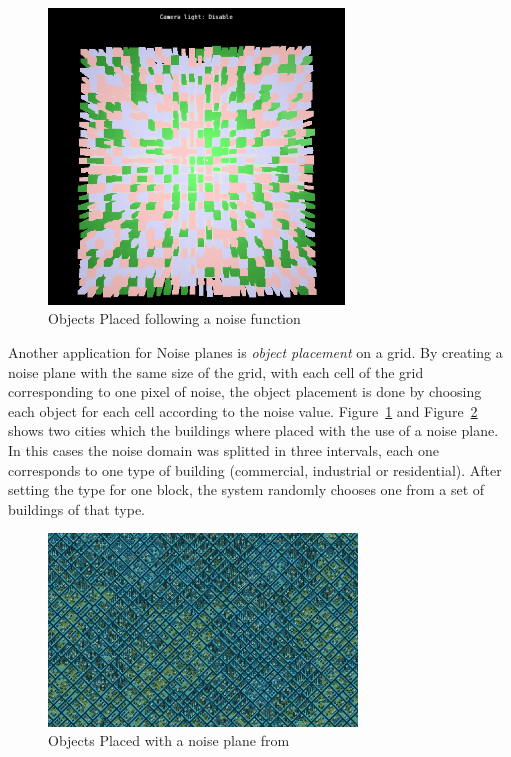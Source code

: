 \begin{figure}[htbp]
    \centering
    \includegraphics[width=0.7\textwidth]{img/Theory/Perlin_Noise/AppletNoName201501191604.png}
    \caption{Objects Placed following a noise function}
    \label{fig:MyNCity}
\end{figure}

Another application for Noise planes is \emph{object placement} on a grid. By creating a noise plane with the same size of the grid, with each cell of the grid corresponding to one pixel of noise, the object placement is done by choosing each object for each cell according to the noise value. Figure~\ref{fig:MyNCity} and
Figure~\ref{fig:NCity} shows two cities which the buildings where placed with the use of a noise plane. In this cases the noise domain was splitted in three intervals, each one corresponds to one type of building (commercial, industrial or residential). After setting the type for one block, the system randomly chooses one from a set of buildings of that type.


\begin{figure}[]
	\centering
	\includegraphics[width=0.73\textwidth]{img/Theory/Perlin_Noise/NoisyCity.jpg}
	\caption{Objects Placed with a noise plane from \cite{NoisesGAMES}}
	\label{fig:NCity}
\end{figure}

